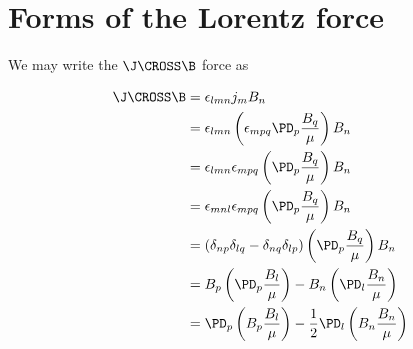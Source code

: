 \documentclass[11pt]{article}
\begin{document}
\doublespacing
\MOONSTITLE
\maketitle

\section{Forms of the Lorentz force}

We may write the $\J\CROSS \B$ force as

\begin{equation}\begin{aligned}
	\J\CROSS \B
	& = \epsilon_{lmn} j_m B_n \\
	& = \epsilon_{lmn} \left( \epsilon_{mpq} \PD_p \frac{B_q}{\mu} \right) B_n \\
	& = \epsilon_{lmn} \epsilon_{mpq} \left( \PD_p \frac{B_q}{\mu} \right) B_n \\
	& = \epsilon_{mnl} \epsilon_{mpq} \left( \PD_p \frac{B_q}{\mu} \right) B_n \\
	& = (\delta_{np} \delta_{lq} - \delta_{nq} \delta_{lp} ) \left( \PD_p \frac{B_q}{\mu} \right) B_n \\
	& = B_p \left( \PD_p \frac{B_l}{\mu} \right) - B_n \left( \PD_l \frac{B_n}{\mu} \right) \\
	& = \PD_p \left( B_p \frac{B_l}{\mu} \right) - \frac{1}{2} \PD_l \left( B_n \frac{B_n}{\mu} \right) \\
\end{aligned} \end{equation}
\end{document}
